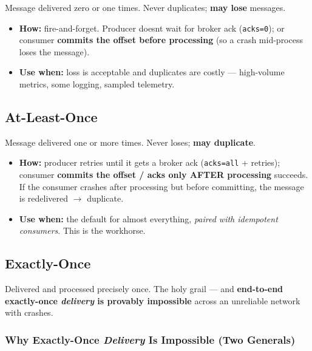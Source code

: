 \documentclass[11pt]{article}
\providecommand{\tightlist}{\setlength{\itemsep}{1pt}\setlength{\parskip}{0pt}}
\begin{document}
Message delivered zero or one times. Never duplicates; \textbf{may lose} messages.

\begin{itemize}
\tightlist
\item
  \textbf{How:} fire-and-forget. Producer doesn\textquotesingle t wait for broker ack (\texttt{acks=0}); or consumer \textbf{commits the offset before processing} (so a crash mid-process loses the message).
\item
  \textbf{Use when:} loss is acceptable and duplicates are costly --- high-volume metrics, some logging, sampled telemetry.
\end{itemize}

\subsection{At-Least-Once}\label{at-least-once}

Message delivered one or more times. Never loses; \textbf{may duplicate}.

\begin{itemize}
\tightlist
\item
  \textbf{How:} producer retries until it gets a broker ack (\texttt{acks=all} + retries); consumer \textbf{commits the offset / acks only AFTER processing} succeeds. If the consumer crashes after processing but before committing, the message is redelivered \(\rightarrow\) duplicate.
\item
  \textbf{Use when:} the default for almost everything, \emph{paired with idempotent consumers}. This is the workhorse.
\end{itemize}

\subsection{Exactly-Once}\label{exactly-once}

Delivered and processed precisely once. The holy grail --- and \textbf{end-to-end exactly-once \emph{delivery} is provably impossible} across an unreliable network with crashes.

\subsubsection{\texorpdfstring{Why Exactly-Once \emph{Delivery} Is Impossible (Two Generals)}{Why Exactly-Once Delivery Is Impossible (Two Generals)}}\label{why-exactly-once-delivery-is-impossible-two-generals}
\end{document}
